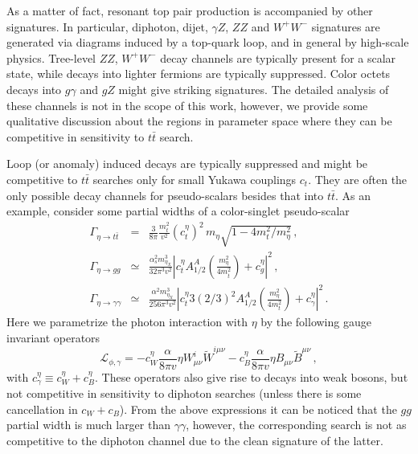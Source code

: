 \documentclass[aps,prd,amsmath,amssymb,superscriptaddress, preprintnumbers,preprint,nofootinbib,a4paper]{revtex4}
\begin{document}
As a matter of fact, resonant top pair production is accompanied by other signatures. In particular, diphoton,
  dijet, $\gamma Z$, $ZZ$ and $W^+W^-$ signatures are generated via diagrams induced by a top-quark loop, and in
  general by high-scale physics. Tree-level $ZZ$, $W^+ W^-$ decay channels are typically present for a scalar state,
  while decays into lighter fermions are typically suppressed.  Color octets decays into $g\gamma$ and $g Z$ might
  give striking signatures. The detailed analysis of these channels is not in the scope of this work, however, we
  provide some qualitative discussion about the regions in parameter space where they can be competitive in
  sensitivity to $t\bar{t}$ search.

  Loop (or anomaly) induced decays are typically suppressed and might be competitive to $t\bar{t}$ searches only
  for small Yukawa couplings $c_t$. They are often the only possible decay channels for pseudo-scalars besides
  that into $t\bar{t}$. As an example, consider some partial widths of a color-singlet pseudo-scalar 
\begin{eqnarray}
\Gamma_{\eta\to t\bar{t}} &=& \frac{3}{8\pi} %
    \frac{m_t^2}{v^2}(c^\eta_t)^2\,  m_{\eta}\sqrt{1-4 m_t^2/m_{\eta}^2}  \,, \\
\Gamma_{\eta \to gg} &\simeq&  \frac{\alpha_s^2m_{\eta_X}^3}{32 \pi^3 v^2} 
      \left|  c_t^\eta A^{A}_{1/2}\left(\frac{m_\eta^2}{4m_t^2}\right)+ c_g^\eta \right|^2 \,,\\
      \label{eq:gamma-eta-gg}
\Gamma_{\eta \to \gamma\gamma} &\simeq&  \frac{\alpha^2 m_{\eta_X}^3}{256 \pi^3 v^2} 
      \left|  c_t^\eta 3(2/3)^2 A^{A}_{1/2}\left(\frac{m_\eta^2}{4m_t^2}\right)+ c_\gamma^\eta \right|^2\,.
\label{Eq:partialwidths}
\end{eqnarray}
Here we parametrize the photon interaction with $\eta$ by the following gauge invariant operators
\begin{equation}
\mathcal{L}_{\phi,\gamma} = - c_W^\eta \frac{\alpha}{8\pi v}\eta W^i_{\mu\nu}\widetilde{W}^{i\mu\nu} - c_B^\eta \frac{\alpha}{8\pi v}\eta B_{\mu\nu}\widetilde{B}^{\mu\nu}\,,
\end{equation}
with $c_\gamma^\eta\equiv c_W^\eta+c_B^\eta$.
These operators also give rise to decays into weak bosons, but not competitive in
sensitivity to diphoton searches (unless there is some cancellation in $c_W+c_B$).
From the above expressions it can be noticed that the $gg$ partial width is much larger than $\gamma\gamma$,
however, the corresponding search is not as competitive to the diphoton channel due to
the clean signature of the latter. 
\end{document}
